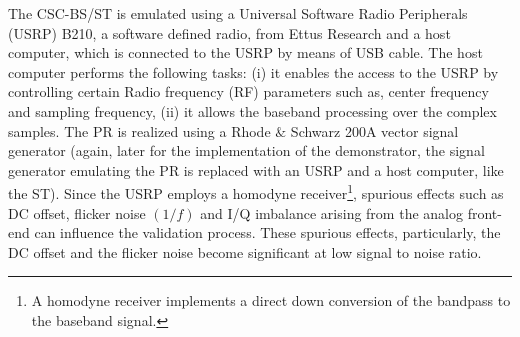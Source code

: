 The CSC-BS/ST is emulated using a Universal Software Radio Peripherals (USRP) B210, a software defined radio, from Ettus Research \cite{Ettus} and a host computer, which is connected to the USRP by means of USB cable. The host computer performs the following tasks: (i) it enables the access to the USRP by controlling certain Radio frequency (RF) parameters such as, center frequency and sampling frequency, (ii) it allows the baseband processing over the complex samples. %
The PR is realized using a Rhode $\&$ Schwarz 200A vector signal generator (again, later for the implementation of the demonstrator, the signal generator emulating the PR is replaced with an USRP and a host computer, like the ST). Since the USRP employs a homodyne receiver\footnote{A homodyne receiver implements a direct down conversion of the bandpass to the baseband signal.}, spurious effects such as DC offset, flicker noise $(1/f)$ and I/Q imbalance arising from the analog front-end can influence the validation process. These spurious effects, particularly, the DC offset and the flicker noise become significant at low signal to noise ratio. 

